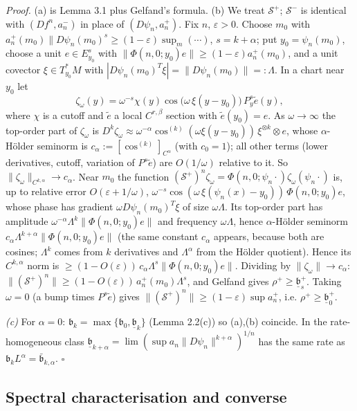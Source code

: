 \documentclass[11pt,a4paper]{article}
\theoremstyle{plain}
\theoremstyle{definition}
\theoremstyle{remark}
\numberwithin{equation}{section}
\numberwithin{figure}{section}
\begin{document}
\textit{Proof.} (a) is Lemma 3.1 plus Gelfand's formula. (b) We treat $\mathcal S^+$; $\mathcal S^-$ is identical with $(Df^n,a^-_n)$ in place of $(D\psi_n,a^+_n)$. Fix $n$, $\varepsilon>0$. Choose $m_0$ with $a^+_n(m_0)\|D\psi_n(m_0)^s\ge(1-\varepsilon)\sup_m(\cdots)$, $s=k+\alpha$; put $y_0=\psi_n(m_0)$, choose a unit $e\in E^s_{y_0}$ with $\|\Phi(n,0;y_0)e\|\ge(1-\varepsilon)a^+_n(m_0)$, and a unit covector $\xi\in T^*_{y_0}M$ with $|D\psi_n(m_0)^{T}\xi|=\|D\psi_n(m_0)\|=:\Lambda$. In a chart near $y_0$ let
\[
\zeta_\omega(y)=\omega^{-s}\chi(y)\cos\big(\omega\,\xi(y-y_0)\big)\,P^s_y\tilde e(y),
\]
where $\chi$ is a cutoff and $\tilde e$ a local $C^{r,\beta}$ section with $\tilde e(y_0)=e$. As $\omega\to\infty$ the top-order part of $\zeta_\omega$ is $D^k\zeta_\omega\approx\omega^{-\alpha}\cos^{(k)}(\omega\xi(y-y_0))\,\xi^{\otimes k}\otimes e$, whose $\alpha$-Hölder seminorm is $c_\alpha:=[\cos^{(k)}]_{C^\alpha}$ (with $c_0=1$); all other terms (lower derivatives, cutoff, variation of $P^s\tilde e$) are $O(1/\omega)$ relative to it. So $\|\zeta_\omega\|_{C^{k,\alpha}}\to c_\alpha$. Near $m_0$ the function $(\mathcal S^+)^n\zeta_\omega=\Phi(n,0;\psi_n\cdot)\zeta_\omega(\psi_n\cdot)$ is, up to relative error $O(\varepsilon+1/\omega)$, $\omega^{-s}\cos(\omega\,\xi(\psi_n(x)-y_0))\,\Phi(n,0;y_0)e$, whose phase has gradient $\omega D\psi_n(m_0)^T\xi$ of size $\omega\Lambda$. Its top-order part has amplitude $\omega^{-\alpha}\Lambda^k\|\Phi(n,0;y_0)e\|$ and frequency $\omega\Lambda$, hence $\alpha$-Hölder seminorm $c_\alpha\Lambda^{k+\alpha}\|\Phi(n,0;y_0)e\|$ (the same constant $c_\alpha$ appears, because both are cosines; $\Lambda^k$ comes from $k$ derivatives and $\Lambda^\alpha$ from the Hölder quotient). Hence its $C^{k,\alpha}$ norm is $\ge(1-O(\varepsilon))\,c_\alpha\Lambda^{s}\|\Phi(n,0;y_0)e\|$. Dividing by $\|\zeta_\omega\|\to c_\alpha$: $\|(\mathcal S^+)^n\|\ge(1-O(\varepsilon))\,a^+_n(m_0)\Lambda^{s}$, and Gelfand gives $\rho^+\ge\underline{\mathfrak b}^+_s$. Taking $\omega=0$ (a bump times $P^s\tilde e$) gives $\|(\mathcal S^+)^n\|\ge(1-\varepsilon)\sup a^+_n$, i.e. $\rho^+\ge\underline{\mathfrak b}^+_0$.

\textit{(c)} For $\alpha=0$: $\mathfrak b_k=\max\{\mathfrak b_0,\underline{\mathfrak b}_k\}$ (Lemma 2.2(c)) so (a),(b) coincide. In the rate-homogeneous class $\underline{\mathfrak b}_{k+\alpha}=\lim(\sup a_n\|D\psi_n\|^{k+\alpha})^{1/n}$ has the same rate as $\mathfrak b_kL^\alpha=\bar{\mathfrak b}_{k,\alpha}$. $\square$

\subsection{Spectral characterisation and converse}
\end{document}
